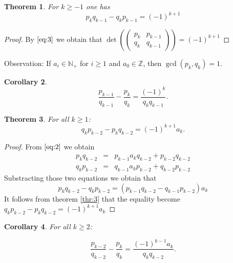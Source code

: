 \documentclass[a4paper,11pt,american]{article}
\newcommand{\N}{\mathbb{N}}
\newcommand{\Z}{\mathbb{Z}}
\theoremstyle{plain}
\newtheorem{theorem}{Theorem}
\newtheorem{corollary}[theorem]{Corollary}
\theoremstyle{definition}
\begin{document}
\begin{theorem}
  \label{thr:3}
  For $k\geq -1$ one has
  \begin{displaymath}
    p_k q_{k-1} - q_k p_{k-1} = (-1)^{k+1} 
  \end{displaymath}
\end{theorem}
\begin{proof}
    By $\eqref{eq:3}$ we obtain that $\det(\begin{pmatrix}
    p_k & p_{k-1} \\
    q_k & q_{k-1}
  \end{pmatrix})=(-1)^{k+1}$
\end{proof}
Observation: If $a_i \in\N_+$ for $i\geq1$ and $a_0 \in\Z$, then $\gcd(p_k,q_k) = 1$.
\begin{corollary}
  \label{co:1}
  \begin{equation}
    \label{eq:4}
      \frac{p_{k-1}}{q_{k-1}} - \frac{p_k}{q_k} = \frac{(-1)^k }{q_k q_{k-1}}.    
  \end{equation}

\end{corollary}

\begin{theorem}
  For all $k\geq 1$:
  \begin{displaymath}
    q_k p_{k-2} - p_k q_{k-2} = (-1)^ {k+1} a_k. 
  \end{displaymath}
\end{theorem}
\begin{proof}
    From $\eqref{eq:2}$ we obtain \begin{equation}
        \label{eq:5}\begin{array}{rcl}
         p_ kq_{k-2} &=&  p_{k-1} a_kq_{k-2} + p_{k-2}q_{k-2}\\
        q_ kp_{k-2}  &=& q_{k-1} a_kp_{k-2} + q_{k-2}p_{k-2}
        \end{array}
    \end{equation}
    Substracting those two equations we obtain that 
    $$ p_ kq_{k-2}-q_ kp_{k-2}=(p_{k-1}q_{k-2}-q_{k-1}p_{k-2})a_k$$
    It follows from theorem \eqref{thr:3} that the equality become $q_k p_{k-2} - p_k q_{k-2} = (-1)^ {k+1} a_k$
\end{proof}

\begin{corollary}
  \label{co:2}
  For all $k\geq 2$:

  \begin{displaymath}
    \frac{p_{k-2}}{q_{k-2}} -    \frac{p_k}{q_k} = \frac{(-1)^{k-1} a_k}{q_k q_{k-2}}. 
  \end{displaymath}
\end{corollary}
\end{document}

